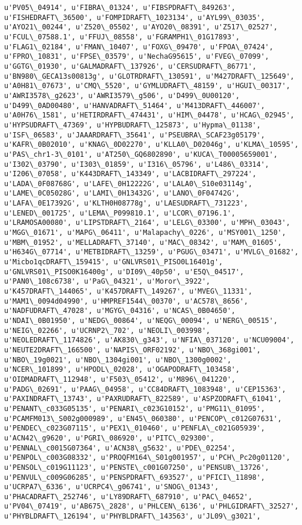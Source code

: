 \documentclass[11pt]{article}
\begin{document}
\begin{Verbatim}[commandchars=\\\{\}]
u'PV05\_04914', u'FIBRA\_01324', u'FIBSPDRAFT\_849263', u'FISHEDRAFT\_36500', u'FOMPIDRAFT\_1023134', u'AYL99\_03035', u'AYO21\_00244', u'Z520\_05502', u'AYO20\_08391', u'Z517\_02527', u'FCUL\_07588.1', u'FFUJ\_08558', u'FGRAMPH1\_01G17893', u'FLAG1\_02184', u'FMAN\_10407', u'FOXG\_09470', u'FPOA\_07424', u'FPRO\_10831', u'FPSE\_03579', u'NechaG95615', u'FVEG\_07099', u'GGTG\_01930', u'GALMADRAFT\_137926', u'CERSUDRAFT\_86771', u'BN980\_GECA13s00813g', u'GLOTRDRAFT\_130591', u'M427DRAFT\_125649', u'A0H81\_07673', u'CMQ\_5520', u'GYMLUDRAFT\_48159', u'HGUI\_00317', u'AWRI3578\_g2623', u'AWRI3579\_g506', u'D499\_0U00120', u'D499\_0AD00480', u'HANVADRAFT\_51464', u'M413DRAFT\_446007', u'A0H76\_1581', u'HETIRDRAFT\_474431', u'HIM\_04478', u'HCAG\_02945', u'HYPSUDRAFT\_47369', u'HYPBUDRAFT\_125873', u'Hypma\_01138', u'ISF\_06583', u'JAAARDRAFT\_35641', u'PSEUBRA\_SCAF23g05179', u'KAFR\_0B02010', u'KNAG\_0D02270', u'KLLA0\_D02046g', u'KLMA\_10595', u'PAS\_chr1-3\_0101', u'AT250\_GQ6802890', u'KUCA\_T00005659001', u'I302\_03790', u'I303\_01859', u'I316\_05796', u'L486\_03314', u'I206\_07058', u'K443DRAFT\_143349', u'LACBIDRAFT\_297224', u'LADA\_0F08768G', u'LAFE\_0H12222G', u'LALA0\_S10e03114g', u'LAME\_0C05028G', u'LAMI\_0H13432G', u'LANO\_0F04742G', u'LAFA\_0E17392G', u'KLTH0H08778g', u'LAESUDRAFT\_731223', u'LENED\_001725', u'LEMA\_P099810.1', u'LCOR\_07196.1', u'LRAMOSA00080', u'LIPSTDRAFT\_2164', u'LELG\_03300', u'MPH\_03043', u'MGG\_01671', u'MAPG\_06411', u'Malapachy\_0226', u'MSY001\_1250', u'MBM\_01952', u'MELLADRAFT\_37140', u'MAC\_08342', u'MAM\_01605', u'H634G\_07714', u'METBIDRAFT\_13259', u'PGUG\_03471', u'MVLG\_01682', u'Micbo1qcDRAFT\_159415', u'GNLVRS01\_PISO0L16401g', u'GNLVRS01\_PISO0K16400g', u'DI09\_40p50', u'E5Q\_04517', u'PAN0\_108c6738', u'PaG\_04321', u'Moror\_3922', u'K457DRAFT\_144065', u'K457DRAFT\_149267', u'MVEG\_11331', u'MAM1\_0094d04990', u'HMPREF1544\_00370', u'AC578\_8656', u'NADFUDRAFT\_47028', u'MGYG\_04316', u'NCAS\_0B04650', u'NDAI\_0B01950', u'NEDG\_00864', u'NEQG\_00094', u'NERG\_00515', u'NEIG\_02266', u'UCRNP2\_702', u'NEOLI\_003998', u'NEOLEDRAFT\_1174826', u'AK830\_g343', u'NFIA\_037120', u'NCU09004', u'NEUTE2DRAFT\_166500', u'NAPIS\_ORF02192', u'NBO\_368gi001', u'NBO\_19g0021', u'NBO\_1304gi001', u'NBO\_1300g0002', u'NCER\_101899', u'HPODL\_02028', u'OGAPODRAFT\_103458', u'OIDMADRAFT\_112948', u'F503\_05412', u'M896\_041220', u'PADG\_02691', u'PAAG\_04958', u'CC84DRAFT\_1083948', u'CEP15363', u'PAXINDRAFT\_13743', u'PAXRUDRAFT\_822589', u'ASPZODRAFT\_61041', u'PENANT\_c033G05135', u'PENARI\_c023G10152', u'PMG11\_01095', u'PCAMFM013\_S002g000989', u'EN45\_060380', u'PENCOP\_c012G07631', u'PENDEC\_c023G07115', u'PEX1\_010460', u'PENFLA\_c021G05939', u'ACN42\_g9620', u'PGRI\_086920', u'PITC\_029300', u'PENNAL\_c0015G07364', u'ACN38\_g5632', u'PDE\_02254', u'PENPOL\_c003G08332', u'PROQFM164\_S01g001957', u'PCH\_Pc20g01120', u'PENSOL\_c019G11123', u'PENSTE\_c001G07250', u'PENSUB\_13726', u'PENVUL\_c009G06285', u'PENSPDRAFT\_693527', u'PFICI\_11898', u'UCRPA7\_6336', u'UCRPC4\_g06741', u'SNOG\_01343', u'PHACADRAFT\_252746', u'LY89DRAFT\_687910', u'PAC\_04652', u'PV04\_07419', u'AB675\_2828', u'PHLCEN\_6136', u'PHLGIDRAFT\_32527', u'PHYBLDRAFT\_126194', u'PHYBLDRAFT\_143563', u'JL09\_g3021', 
\end{Verbatim}
\end{document}
